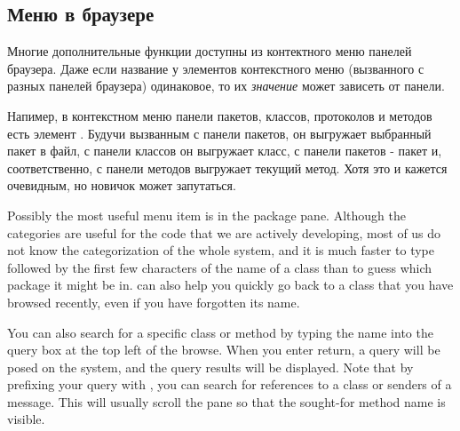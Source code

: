 \documentclass[a4paper,10pt,twoside]{book}
\begin{document}
\subsection{Меню в браузере}


Многие дополнительные функции доступны из контектного меню панелей браузера. Даже если название у элементов контекстного меню (вызванного с разных панелей браузера) одинаковое, то их \emph{значение} может зависеть от панели.


Напимер, в контекстном меню панели пакетов, классов, протоколов и методов есть элемент . Будучи вызванным с панели пакетов, он выгружает выбранный пакет в файл, с панели классов он выгружает класс, с панели пакетов - пакет и, соответственно, с панели методов выгружает текущий метод. Хотя это и кажется очевидным, но новичок может запутаться. 

Possibly the most useful menu item is  in the package pane.  Although the categories are useful for the code that we are actively developing, most of us do not know the categorization of the whole system, and it is much faster to type  followed by the first few characters of the name of a class than to guess which package it might be in.   can also help you quickly go back to a class that you have browsed recently, even if you have forgotten its name.

You can also search for a specific class or method by typing the name into the query box at the top left of the browse.  When you enter return, a query will be posed on the system, and the query results will be displayed.  Note that by prefixing your query with \ct{#}, you can search for references to a class or senders of a message. This will usually scroll the pane so that the sought-for method name is visible.
\end{document}
